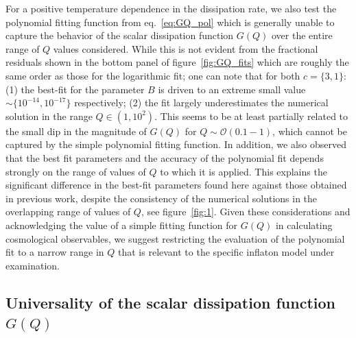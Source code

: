 \documentclass[a4paper,11pt]{article}
\begin{document}
For a positive temperature dependence in the dissipation rate, we also test the polynomial fitting function from eq.~\eqref{eq:GQ_pol} which is generally unable to capture the behavior of the scalar dissipation function $G(Q)$ over the entire range of $Q$ values considered. While this is not evident from the fractional residuals shown in the bottom panel of figure~\ref{fig:GQ_fits} which are roughly the same order as those for the logarithmic fit; one can note that for both $c=\{3,1\}$: (1) the best-fit for the parameter $B$ is driven to an extreme small value $\sim \{10^{-14}, 10^{-17}\}$ respectively; (2) the fit largely underestimates the numerical solution in the range $Q\in (1,10^{2})$. This seems to be at least partially related to the small dip in the magnitude of $G(Q)$ for $Q\sim \mathcal{O}(0.1-1)$, which cannot be captured by the simple polynomial fitting function. In addition, we also observed that the best fit parameters and the accuracy of the polynomial fit depends strongly on the range of values of $Q$ to which it is applied. This explains the significant difference in the best-fit parameters found here against those obtained in previous work, despite the consistency of the numerical solutions in the overlapping range of values of $Q$, see figure~\ref{fig:1}.  Given these considerations and acknowledging the value of a simple fitting function for $G(Q)$ in calculating cosmological observables, we suggest restricting the evaluation of the polynomial fit to a narrow range in $Q$ that is relevant to the specific inflaton model under examination. 

\subsection{Universality of the scalar dissipation function $G(Q)$ \label{sec:results_2}}
\end{document}
